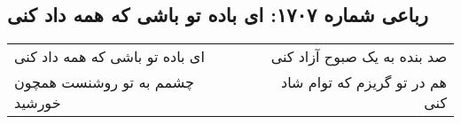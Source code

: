 \begin{center}
\section*{رباعی شماره ۱۷۰۷: ای باده تو باشی که همه داد کنی}
\label{sec:1707}
\begin{longtable}{l p{0.5cm} r}
ای باده تو باشی که همه داد کنی
&&
صد بنده به یک صبوح آزاد کنی
\\
چشمم به تو روشنست همچون خورشید
&&
هم در تو گریزم که توام شاد کنی
\\
\end{longtable}
\end{center}
